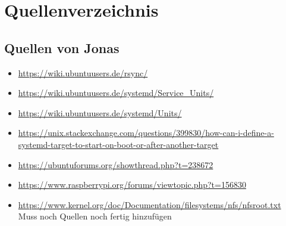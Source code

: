 
\section{Quellenverzeichnis}
\subsection{Quellen von Jonas}
\begin{itemize}
\item \url{https://wiki.ubuntuusers.de/rsync/}\\
\item \url{https://wiki.ubuntuusers.de/systemd/Service_Units/}\\
\item \url{https://wiki.ubuntuusers.de/systemd/Units/}\\
\item \url{https://unix.stackexchange.com/questions/399830/how-can-i-define-a-systemd-target-to-start-on-boot-or-after-another-target}\\
\item \url{https://ubuntuforums.org/showthread.php?t=238672}\\
\item \url{https://www.raspberrypi.org/forums/viewtopic.php?t=156830}\\
\item \url{https://www.kernel.org/doc/Documentation/filesystems/nfs/nfsroot.txt}\\

Muss noch Quellen noch fertig hinzufügen
\end{itemize}
